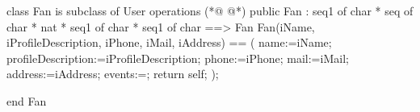 \begin{vdmpp}[breaklines=true]
class Fan is subclass of User 
operations
(*@
\label{Fan:3}
@*)
public  Fan : seq1 of char * seq of char * nat * seq1 of char * seq1 of char  ==> Fan
  Fan(iName, iProfileDescription, iPhone, iMail, iAddress) == (
   name:=iName;
   profileDescription:=iProfileDescription;
   phone:=iPhone;
   mail:=iMail;
   address:=iAddress;
   events:={};
   return self;
  );

end Fan
\end{vdmpp}
